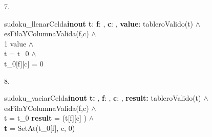 \documentclass[a4paper]{article}
\begin{document}
7. \begin{proc}{sudoku\_llenarCelda}{\textbf{inout t}: \matriz{\ent} \textbf{\In f}: \ent, \textbf{\In c}: \ent, \textbf{\In value}: \ent}{}{}
    \pre
		{
			tableroValido(t) $\land$\\
			esFilaYColumnaValida(f,c) $\land$\\
			1 \leq value  $\land$\\
			t = t_{0} $\land$\\
			t_{0}[f][c] = 0
		}
	\end{proc}

8. \begin{proc}{sudoku\_vaciarCelda}{\textbf{inout t:} \matriz{\ent}, \textbf{\In f}: \ent, \textbf{\In c}: \ent, \textbf{\Out result:} \bool}{}{}
		\pre
		{
			tableroValido(t)  $\land$ \\
			esFilaYColumnaValida(f,c)  $\land$ \\
			t = t_{0}
		}
    \post
		{ \textbf{result} = (t[f][c]  ) $\land$ \\
			\textbf{t} = SetAt(t_{0}[f], c, 0) \\
			 
		}
	\end{proc}
\end{document}

